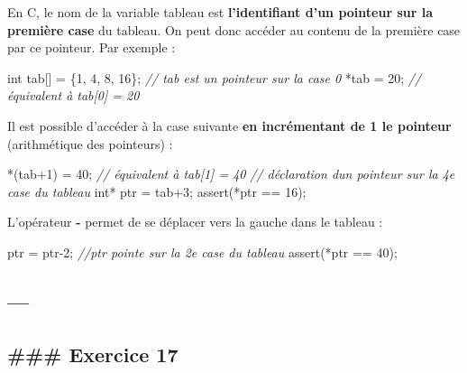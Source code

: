 \documentclass[11pt]{article}
\newenvironment{Shaded}{}{}
\newcommand{\DataTypeTok}[1]{\textcolor[rgb]{0.56,0.13,0.00}{{#1}}}
\newcommand{\DecValTok}[1]{\textcolor[rgb]{0.25,0.63,0.44}{{#1}}}
\newcommand{\CommentTok}[1]{\textcolor[rgb]{0.38,0.63,0.69}{\textit{{#1}}}}
\newcommand{\NormalTok}[1]{{#1}}
\begin{document}
En C, le nom de la variable tableau est \textbf{l'identifiant d'un
pointeur sur la première case} du tableau. On peut donc accéder au
contenu de la première case par ce pointeur. Par exemple :

\begin{Shaded}
\begin{Highlighting}[]
    \DataTypeTok{int}\NormalTok{ tab[] = \{}\DecValTok{1}\NormalTok{, }\DecValTok{4}\NormalTok{, }\DecValTok{8}\NormalTok{, }\DecValTok{16}\NormalTok{\};}
    \CommentTok{// tab est un pointeur sur la case 0}
\NormalTok{    *tab = }\DecValTok{20}\NormalTok{; }\CommentTok{// équivalent à tab[0] = 20}
\end{Highlighting}
\end{Shaded}

Il est possible d'accéder à la case suivante \textbf{en incrémentant de
1 le pointeur} (arithmétique des pointeurs) :

\begin{Shaded}
\begin{Highlighting}[]
\NormalTok{    *(tab+}\DecValTok{1}\NormalTok{) = }\DecValTok{40}\NormalTok{; }\CommentTok{// équivalent à tab[1] = 40}
    \CommentTok{// déclaration d\textquotesingle{}un pointeur sur la 4e case du tableau}
    \DataTypeTok{int}\NormalTok{* ptr = tab+}\DecValTok{3}\NormalTok{;}
\NormalTok{    assert(*ptr == }\DecValTok{16}\NormalTok{);}
\end{Highlighting}
\end{Shaded}

L'opérateur \textbf{-} permet de se déplacer vers la gauche dans le
tableau :

\begin{Shaded}
\begin{Highlighting}[]
\NormalTok{    ptr = ptr{-}}\DecValTok{2}\NormalTok{;}
    \CommentTok{//ptr pointe sur la 2e case du tableau}
\NormalTok{    assert(*ptr == }\DecValTok{40}\NormalTok{);}
\end{Highlighting}
\end{Shaded}

    \hypertarget{section}{%
\subsection{---}\label{section}}

\hypertarget{exercice-17}{%
\subsection{\#\#\# Exercice 17}\label{exercice-17}}
\end{document}
